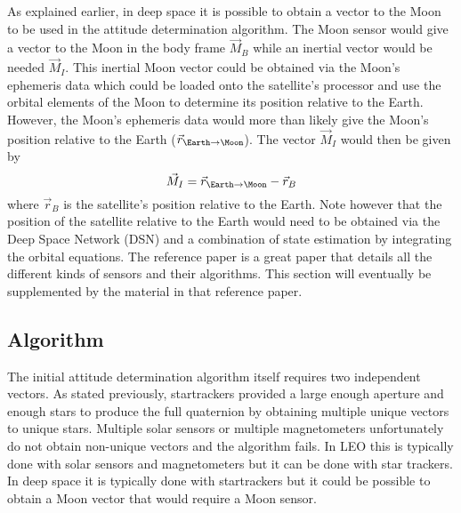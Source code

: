 \documentclass{article}
\begin{document}
As explained earlier, in deep space it is possible to obtain a vector
to the Moon to be used in the attitude determination algorithm. The
Moon sensor would give a vector to the Moon in the body frame
$\vec{M}_B$ while an inertial vector would be needed $\vec{M}_I$. This
inertial Moon vector could be obtained via the Moon's
ephemeris data which could be loaded onto the satellite's processor
and use the orbital elements of the Moon to determine its position
relative to the Earth. However, the Moon's ephemeris data would more
than likely give the Moon's position relative to the Earth
($\vec{r}_{\Earth \rightarrow \Moon}$). The vector $\vec{M}_I$ would
then be given by
\begin{equation}
  \vec{M}_I = \vec{r}_{\Earth \rightarrow \Moon} - \vec{r}_{B}
\end{equation}
where $\vec{r}_B$ is the satellite's position relative to the
Earth. Note however that the position of the satellite relative to the
Earth would need to be obtained via the Deep Space Network (DSN) and a
combination of state estimation by integrating the orbital
equations. The reference paper \cite{Munoz} is a great paper that
details all the different kinds of sensors and their algorithms. This
section will eventually be supplemented by the material in that
reference paper.

\subsection{Algorithm}

The initial attitude determination algorithm itself requires two
independent vectors. As stated previously, startrackers provided a
large enough aperture and enough stars to produce the full
quaternion by obtaining multiple unique vectors to unique
stars. Multiple solar sensors or multiple magnetometers unfortunately
do not obtain non-unique vectors and the algorithm fails. In LEO this
is typically done with solar sensors and magnetometers but it can be
done with star trackers. In deep space it is typically done with
startrackers but it could be possible to obtain a Moon vector that
would require a Moon sensor.
\end{document}

